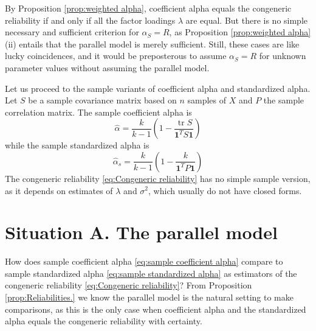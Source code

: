 \documentclass[twoside]{article}
\DeclareMathOperator{\tr}{tr}
\begin{document}

By Proposition \ref{prop:weighted alpha}, coefficient alpha equals the congeneric reliability if and only if all the factor loadings $\lambda$ are equal. But there is no simple necessary and sufficient criterion for $\alpha_S =  R$, as Proposition \ref{prop:weighted alpha} (ii) entails that the parallel model is merely sufficient. Still, these cases are like lucky coincidences, and it would be preposterous to assume $\alpha_S =  R$ for unknown parameter values without assuming the parallel model.

Let us proceed to the sample variants of coefficient alpha and standardized
alpha. Let $S$ be a sample covariance matrix based on
$n$ samples of $X$ and $P$ the sample correlation matrix.
The sample coefficient alpha is 
\begin{equation}
\hat{\alpha}=\frac{k}{k-1}\left(1-\frac{\tr{S}}{\boldsymbol{1}^{T}S\boldsymbol{1}}\right)\label{eq:sample coefficient alpha}
\end{equation}
while the sample standardized alpha is
\begin{equation}
\hat{\alpha}_s=\frac{k}{k-1}\left(1-\frac{k}{\boldsymbol{1}^{T}P\boldsymbol{1}}\right)\label{eq:sample standardized alpha}
\end{equation}
The congeneric reliability \eqref{eq:Congeneric reliability} has no
simple sample version, as it depends on estimates of $\lambda$ and
$\sigma^2$, which usually do not have closed forms.

\section{Situation A. The parallel model}
\label{sec:argument A}

How does sample coefficient alpha \eqref{eq:sample coefficient alpha} compare to sample standardized alpha \eqref{eq:sample standardized alpha} as estimators of the congeneric reliability \eqref{eq:Congeneric reliability}? From Proposition \ref{prop:Reliabilities.} we know the parallel model is the natural setting to make comparisons, as this is the only case when coefficient alpha and the standardized alpha equals the congeneric reliability with certainty.
\end{document}
